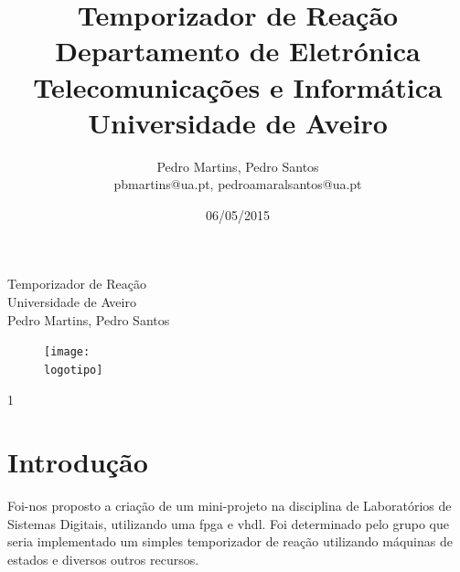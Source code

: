 \documentclass[a4paper,11pt,onecolumn]{report}
\begin{document}
%
\def\titulo{Temporizador de Reação}
\def\data{06/05/2015}
\def\autores{Pedro Martins, Pedro Santos}
\def\autorescontactos{pbmartins@ua.pt, pedroamaralsantos@ua.pt}
\def\versao{1}
\def\departamento{Departamento de Eletrónica Telecomunicações e Informática}
\def\empresa{Universidade de Aveiro}
\def\logotipo{ua.pdf}
%
%
\begin{titlepage}

\begin{center}
%
\vspace*{50mm}
%
{\Huge \titulo}\\ 
%
\vspace{10mm}
%
{\Large \empresa}\\
%
\vspace{10mm}
%
{\LARGE \autores}\\ 
%
%
\vspace{30mm}
%
\begin{figure}[h]
\center
\texttt{[image: \\logotipo]}
\end{figure}
%
\vspace{30mm}
\end{center}
%
\begin{flushright}
\versao
\end{flushright}
\end{titlepage}

%
%
%
%
\title{%
{\Huge\textbf{\titulo}}\\
{\Large \departamento\\ \empresa}
}
%
\author{%
    \autores \\
    \autorescontactos
}
%
\date{\data}
%
\maketitle

%
%

\tableofcontents


\clearpage
{}

\chapter{Introdução}
\label{chap.introducao}

Foi-nos proposto a criação de um mini-projeto na disciplina de Laboratórios de Sistemas Digitais, utilizando uma \ac{fpga} e \ac{vhdl}. Foi determinado pelo grupo que seria implementado um simples temporizador de reação utilizando máquinas de estados e diversos outros recursos.
\end{document}
